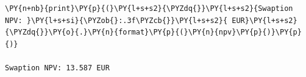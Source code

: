 \begin{Answer}
\begin{tcolorbox}[size=fbox, boxrule=1pt, colback=cellbackground, colframe=cellborder]
\begin{Verbatim}[commandchars=\\\{\}]
\PY{n+nb}{print}\PY{p}{(}\PY{l+s+s2}{\PYZdq{}}\PY{l+s+s2}{Swaption NPV: }\PY{l+s+si}{\PYZob{}:.3f\PYZcb{}}\PY{l+s+s2}{ EUR}\PY{l+s+s2}{\PYZdq{}}\PY{o}{.}\PY{n}{format}\PY{p}{(}\PY{n}{npv}\PY{p}{)}\PY{p}{)}

Swaption NPV: 13.587 EUR
\end{Verbatim}
\end{tcolorbox}
\end{Answer}



